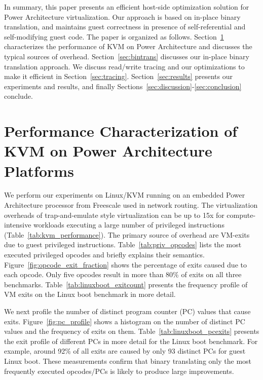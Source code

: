 \documentclass[10pt,twocolumn]{article}
\begin{document}
In summary, this paper presents an efficient host-side optimization solution for
Power Architecture virtualization. Our approach is based on in-place binary translation,
and maintains guest correctness in presence of self-referential and self-modifying
guest code.
The paper is organized as
follows. Section~\ref{sec:performance_char} characterizes the performance of
KVM on Power Architecture and discusses the typical sources of overhead.
Section~\ref{sec:bintrans} discusses our in-place binary translation approach.
We discuss read/write tracing and our optimizations to make
it efficient in Section~\ref{sec:tracing}.
Section~\ref{sec:results} presents our experiments and results, and
finally Sections~\ref{sec:discussion}-\ref{sec:conclusion} conclude.

\section{Performance Characterization of KVM on Power Architecture Platforms}
\label{sec:performance_char}
We perform our experiments on Linux/KVM running on an
embedded Power Architecture processor from Freescale used in network
routing.
The virtualization overheads
of trap-and-emulate style virtualization can be up to 15x for compute-intensive
workloads executing a large number of privileged
instructions (Table~\ref{tab:kvm_performance}). The primary source of
overhead are VM-exits due to guest privileged instructions.
Table~\ref{tab:priv_opcodes} lists the most executed privileged
opcodes and briefly explains their semantics.
Figure~\ref{fig:opcode_exit_fraction} shows the percentage of exits caused
due to each opcode. Only five opcodes result in more than 80\% of exits on all
three benchmarks. Table~\ref{tab:linuxboot_exitcount} presents the frequency
profile of VM exits on the Linux boot benchmark in more detail.

We next profile the number of distinct program counter (PC) values that
cause exits. Figure~\ref{fig:pc_profile} shows a histogram on the number
of distinct PC values and the frequency of exits on them.
Table~\ref{tab:linuxboot_pcexits} presents the exit profile of different
PCs in more detail for the Linux boot benchmark. For example, around 92\% of all
exits are caused by only 93 distinct PCs for guest Linux boot. These
measurements confirm that
binary translating
only the most frequently executed opcodes/PCs is likely to produce large
improvements.
\end{document}
